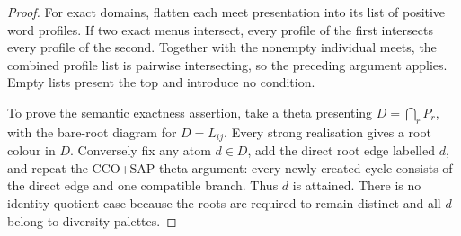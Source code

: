 \begin{proof}
For exact domains, flatten each meet presentation into its list of
positive word profiles.  If two exact menus intersect, every profile
of the first intersects every profile of the second.  Together with
the nonempty individual meets, the combined profile list is
pairwise intersecting, so the preceding argument applies.  Empty
lists present the top and introduce no condition.

To prove the semantic exactness assertion, take a theta presenting
$D=\bigcap_rP_r$, with the bare-root diagram for $D=L_{ij}$.
Every strong realisation gives a root colour in $D$.  Conversely fix
any atom $d\in D$, add the direct root edge labelled $d$, and repeat
the CCO+SAP theta argument: every newly created cycle consists of
the direct edge and one compatible branch.  Thus $d$ is attained.
There is no identity-quotient case because the roots are required
to remain distinct and all $d$ belong to diversity palettes.
\end{proof}

